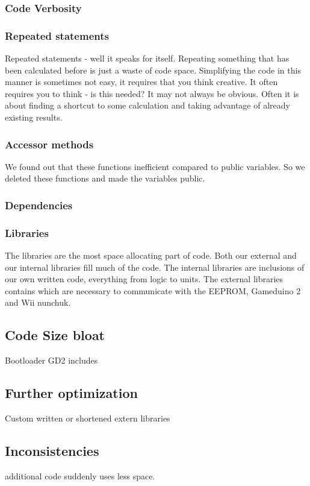 \subsubsection{Code Verbosity}

\subsubsection{Repeated statements }
Repeated statements - well it speaks for itself. Repeating something that has been calculated
before is just a waste of code space. Simplifying the code in this manner is sometimes
not easy, it requires that you think creative. It often requires you to think - is this
needed? It may not always be obvious. Often it is about finding a shortcut to some
calculation and taking advantage of already existing results.

\subsubsection{Accessor methods}
We found out that these functions inefficient
compared to public variables. So we deleted these functions
and made the variables public.

\subsubsection{Dependencies}

\subsubsection{Libraries}
The libraries are the most space allocating part of code. Both our external and
our internal libraries fill much of the code. The internal libraries are
inclusions of our own written code, everything from logic to units. The external
libraries contains which are necessary to communicate with the EEPROM,
Gameduino 2 and Wii nunchuk.

\subsection{Code Size bloat} Bootloader GD2 includes \subsection{Further
optimization} Custom written or shortened extern libraries

\subsection{Inconsistencies} %
additional code suddenly uses less space.
